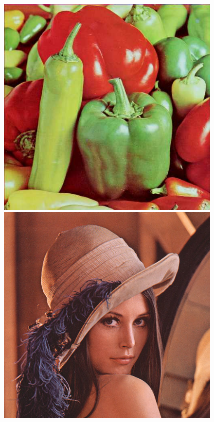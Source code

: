 \documentclass{article}
\begin{document}
\begin{figure}[!htb]
\centering
\includegraphics[scale=0.2]{img/peppers_24bit.png}
\includegraphics[scale=0.269]{img/lena_24bit.png} 

\end{figure}
\end{document}
